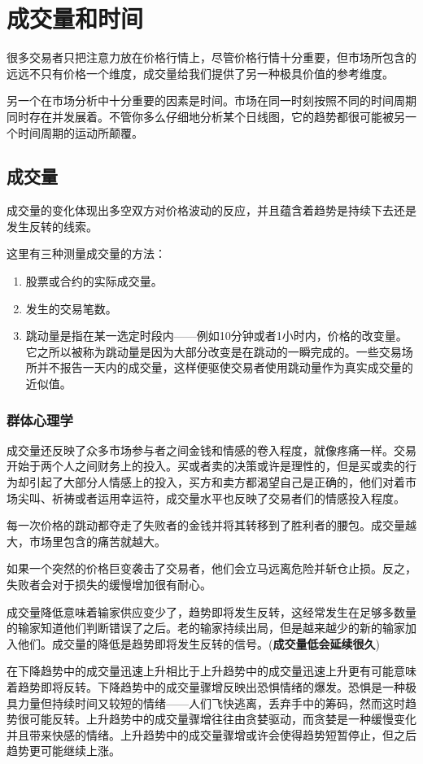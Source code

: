 \chapter{成交量和时间}
很多交易者只把注意力放在价格行情上，尽管价格行情十分重要，但市场所包含的远远不只有价格一个维度，成交量给我们提供了另一种极具价值的参考维度。

另一个在市场分析中十分重要的因素是时间。市场在同一时刻按照不同的时间周期同时存在并发展着。不管你多么仔细地分析某个日线图，它的趋势都很可能被另一个时间周期的运动所颠覆。
\section{成交量}
成交量的变化体现出多空双方对价格波动的反应，并且蕴含着趋势是持续下去还是发生反转的线索。

这里有三种测量成交量的方法：
\begin{enumerate}
    \item 股票或合约的实际成交量。
    \item 发生的交易笔数。
    \item 跳动量是指在某一选定时段内——例如10分钟或者1小时内，价格的改变量。它之所以被称为跳动量是因为大部分改变是在跳动的一瞬完成的。一些交易场所并不报告一天内的成交量，这样便驱使交易者使用跳动量作为真实成交量的近似值。
\end{enumerate}
\subsection*{群体心理学}
成交量还反映了众多市场参与者之间金钱和情感的卷入程度，就像疼痛一样。交易开始于两个人之间财务上的投入。买或者卖的决策或许是理性的，但是买或卖的行为却引起了大部分人情感上的投入，买方和卖方都渴望自己是正确的，他们对着市场尖叫、祈祷或者运用幸运符，成交量水平也反映了交易者们的情感投入程度。

每一次价格的跳动都夺走了失败者的金钱并将其转移到了胜利者的腰包。成交量越大，市场里包含的痛苦就越大。

如果一个突然的价格巨变袭击了交易者，他们会立马远离危险并斩仓止损。反之，失败者会对于损失的缓慢增加很有耐心。

成交量降低意味着输家供应变少了，趋势即将发生反转，这经常发生在足够多数量的输家知道他们判断错误了之后。老的输家持续出局，但是越来越少的新的输家加入他们。成交量的降低是趋势即将发生反转的信号。(\textbf{成交量低会延续很久})

在下降趋势中的成交量迅速上升相比于上升趋势中的成交量迅速上升更有可能意味着趋势即将反转。下降趋势中的成交量骤增反映出恐惧情绪的爆发。恐惧是一种极具力量但持续时间又较短的情绪——人们飞快逃离，丢弃手中的筹码，然而这时趋势很可能反转。上升趋势中的成交量骤增往往由贪婪驱动，而贪婪是一种缓慢变化并且带来快感的情绪。上升趋势中的成交量骤增或许会使得趋势短暂停止，但之后趋势更可能继续上涨。


